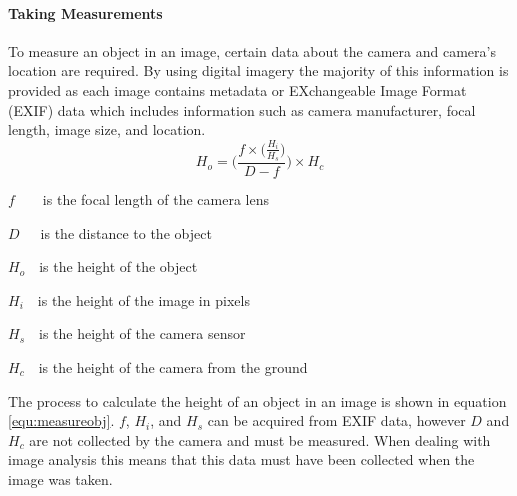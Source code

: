 	\paragraph{Taking Measurements}
	To measure an object in an image, certain data about the camera and camera's location are 
	required. By using digital imagery the majority of this information is provided as each image 
	contains metadata or EXchangeable Image Format (EXIF) data which includes information such as 
	camera manufacturer, focal length, image size, and location.
	\begin{equation}
		\label{equ:measureobj}
		H_{o} = \Bigg(\frac{f\times\big(\frac{H_{i}}{H_{s}}\big)}{D - f}\Bigg)\times H_{c}
	\end{equation}
	\begin{where}
		\item $f$~~~~is the focal length of the camera lens
		\item $D$~~~is the distance to the object
		\item $H_{o}$~~is the height of the object
		\item $H_{i}$~~is the height of the image in pixels
		\item $H_{s}$~~is the height of the camera sensor
		\item $H_{c}$~~is the height of the camera from the ground
	\end{where}

	\vspace{5mm}
	The process to calculate the height of an object in an image is shown in equation \ref{equ:measureobj}. $f$, $H_{i}$, and $H_{s}$ can be acquired from EXIF data, however $D$ and $H_{c}$ are not collected by the camera and must be measured. When dealing with image analysis this means that this data must have been collected when the image was taken.
